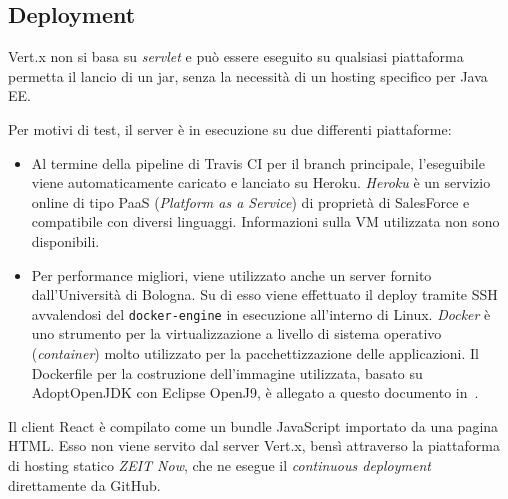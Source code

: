   \subsection{Deployment}
    Vert.x non si basa su \emph{servlet} e può essere eseguito su qualsiasi piattaforma permetta il lancio di un jar, senza la necessità di un hosting specifico per Java EE\@.

    Per motivi di test, il server è in esecuzione su due differenti piattaforme:

    \begin{itemize}
      \item
        Al termine della pipeline di Travis CI per il branch principale, l'eseguibile viene automaticamente caricato e lanciato su Heroku.
        \emph{Heroku} è un servizio online di tipo PaaS (\emph{\emph{P}latform as a \emph{S}ervice}) di proprietà di SalesForce e compatibile con diversi linguaggi.
        Informazioni sulla VM utilizzata non sono disponibili.
      \item
        Per performance migliori, viene utilizzato anche un server fornito dall'Università di Bologna.
        Su di esso viene effettuato il deploy tramite SSH avvalendosi del \texttt{docker-engine} in esecuzione all'interno di Linux.
        \emph{Docker} è uno strumento per la virtualizzazione a livello di sistema operativo (\emph{container}) molto utilizzato per la pacchettizzazione delle applicazioni.
        Il Dockerfile per la costruzione dell'immagine utilizzata, basato su AdoptOpenJDK con Eclipse OpenJ9, è allegato a questo documento in~.
    \end{itemize}

    Il client React è compilato come un bundle JavaScript importato da una pagina HTML\@.
    Esso non viene servito dal server Vert.x, bensì attraverso la piattaforma di hosting statico \emph{ZEIT Now}, che ne esegue il \emph{continuous deployment} direttamente da GitHub.



